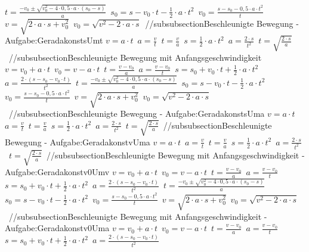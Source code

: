 $ t = \frac{-v_{0}  \pm \sqrt{v_{0} ^{2} -4\cdot 0,5\cdot a\cdot (s_{0}  -s)}}{       a} $\ 
$ s_{0}  = s - v_{0} \cdot t - \frac{1}{2}\cdot a\cdot t^{2} $\ 
$ v_{0}  =\frac{s-s_{0} -0,5\cdot a\cdot t^{2} }{    t} $\ 
$ v  =\sqrt{2\cdot a \cdot s+ v_{0}^2} $\ 
$ v_{0}  =\sqrt{v^2-2\cdot a \cdot s} $\ 
//subsubsection{Beschleunigte Bewegung - Aufgabe:GeradakonstsUmt} 
$ v = a\cdot t $\ 
$ a = \frac{v}{t} $\ 
$ t = \frac{v}{a} $\ 
$ s = \frac{1}{2}\cdot a\cdot t^{2} $\ 
$ a = \frac{2\cdot s}{t^{2} } $\ 
$ t = \sqrt{\frac{2\cdot s}{a}} $\ 
//subsubsection{Beschleunigte Bewegung mit Anfangsgeschwindigkeit} 
$ v = v_{0}  + a\cdot t $\ 
$ v_{0}  = v - a\cdot t $\ 
$ t = \frac{v - v_{0} }{a} $\ 
$ a = \frac{v - v_{0} }{  t} $\ 
$ s = s_{0}  + v_{0} \cdot t + \frac{1}{2}\cdot a\cdot t^{2} $\ 
$ a = \frac{2\cdot (s - s_{0}  - v_{0} \cdot t)}{     t^{2} } $\ 
$ t = \frac{-v_{0}  \pm \sqrt{v_{0} ^{2} -4\cdot 0,5\cdot a\cdot (s_{0}  -s)}}{       a} $\ 
$ s_{0}  = s - v_{0} \cdot t - \frac{1}{2}\cdot a\cdot t^{2} $\ 
$ v_{0}  =\frac{s-s_{0} -0,5\cdot a\cdot t^{2} }{    t} $\ 
$ v  =\sqrt{2\cdot a \cdot s+ v_{0}^2} $\ 
$ v_{0}  =\sqrt{v^2-2\cdot a \cdot s} $\ 
//subsubsection{Beschleunigte Bewegung - Aufgabe:GeradakonstsUma} 
$ v = a\cdot t $\ 
$ a = \frac{v}{t} $\ 
$ t = \frac{v}{a} $\ 
$ s = \frac{1}{2}\cdot a\cdot t^{2} $\ 
$ a = \frac{2\cdot s}{t^{2} } $\ 
$ t = \sqrt{\frac{2\cdot s}{a}} $\ 
//subsubsection{Beschleunigte Bewegung - Aufgabe:GeradakonstvUma} 
$ v = a\cdot t $\ 
$ a = \frac{v}{t} $\ 
$ t = \frac{v}{a} $\ 
$ s = \frac{1}{2}\cdot a\cdot t^{2} $\ 
$ a = \frac{2\cdot s}{t^{2} } $\ 
$ t = \sqrt{\frac{2\cdot s}{a}} $\ 
//subsubsection{Beschleunigte Bewegung mit Anfangsgeschwindigkeit - Aufgabe:Geradakonstv0Umv} 
$ v = v_{0}  + a\cdot t $\ 
$ v_{0}  = v - a\cdot t $\ 
$ t = \frac{v - v_{0} }{a} $\ 
$ a = \frac{v - v_{0} }{  t} $\ 
$ s = s_{0}  + v_{0} \cdot t + \frac{1}{2}\cdot a\cdot t^{2} $\ 
$ a = \frac{2\cdot (s - s_{0}  - v_{0} \cdot t)}{     t^{2} } $\ 
$ t = \frac{-v_{0}  \pm \sqrt{v_{0} ^{2} -4\cdot 0,5\cdot a\cdot (s_{0}  -s)}}{       a} $\ 
$ s_{0}  = s - v_{0} \cdot t - \frac{1}{2}\cdot a\cdot t^{2} $\ 
$ v_{0}  =\frac{s-s_{0} -0,5\cdot a\cdot t^{2} }{    t} $\ 
$ v  =\sqrt{2\cdot a \cdot s+ v_{0}^2} $\ 
$ v_{0}  =\sqrt{v^2-2\cdot a \cdot s} $\ 
//subsubsection{Beschleunigte Bewegung mit Anfangsgeschwindigkeit - Aufgabe:Geradakonstv0Uma} 
$ v = v_{0}  + a\cdot t $\ 
$ v_{0}  = v - a\cdot t $\ 
$ t = \frac{v - v_{0} }{a} $\ 
$ a = \frac{v - v_{0} }{  t} $\ 
$ s = s_{0}  + v_{0} \cdot t + \frac{1}{2}\cdot a\cdot t^{2} $\ 
$ a = \frac{2\cdot (s - s_{0}  - v_{0} \cdot t)}{     t^{2} } $\ 
